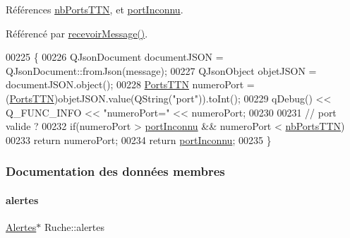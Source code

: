 Références \hyperlink{parametres_8h_a0fe68caa1e9147addc96657cc822b937a5fb860989b1bead466485e87c0a8b0d2}{nb\+Ports\+T\+TN}, et \hyperlink{parametres_8h_a0fe68caa1e9147addc96657cc822b937aaabf64e5057c44a19cf8f4ea1f0fa5b5}{port\+Inconnu}.



Référencé par \hyperlink{class_ruche_a05a34e78d360609f772b9a37c69d0043}{recevoir\+Message()}.


\begin{DoxyCode}
00225 \{
00226     QJsonDocument documentJSON = QJsonDocument::fromJson(message);
00227     QJsonObject objetJSON = documentJSON.object();
00228     \hyperlink{parametres_8h_a0fe68caa1e9147addc96657cc822b937}{PortsTTN} numeroPort = (\hyperlink{parametres_8h_a0fe68caa1e9147addc96657cc822b937}{PortsTTN})objetJSON.value(QString(\textcolor{stringliteral}{"port"})).toInt();
00229     qDebug() << Q\_FUNC\_INFO << \textcolor{stringliteral}{"numeroPort="} << numeroPort;
00230 
00231     \textcolor{comment}{// port valide ?}
00232     \textcolor{keywordflow}{if}(numeroPort > \hyperlink{parametres_8h_a0fe68caa1e9147addc96657cc822b937aaabf64e5057c44a19cf8f4ea1f0fa5b5}{portInconnu} && numeroPort < \hyperlink{parametres_8h_a0fe68caa1e9147addc96657cc822b937a5fb860989b1bead466485e87c0a8b0d2}{nbPortsTTN})
00233         \textcolor{keywordflow}{return} numeroPort;
00234     \textcolor{keywordflow}{return} \hyperlink{parametres_8h_a0fe68caa1e9147addc96657cc822b937aaabf64e5057c44a19cf8f4ea1f0fa5b5}{portInconnu};
00235 \}
\end{DoxyCode}


\subsubsection{Documentation des données membres}
\mbox{\label{class_ruche_af07644ddce44cb5ed4286475dc0f9d46}} 
\paragraph{\texorpdfstring{alertes}{alertes}}
{\footnotesize\ttfamily \hyperlink{class_alertes}{Alertes}$\ast$ Ruche\+::alertes\hspace{0.3cm}{\ttfamily [private]}}



